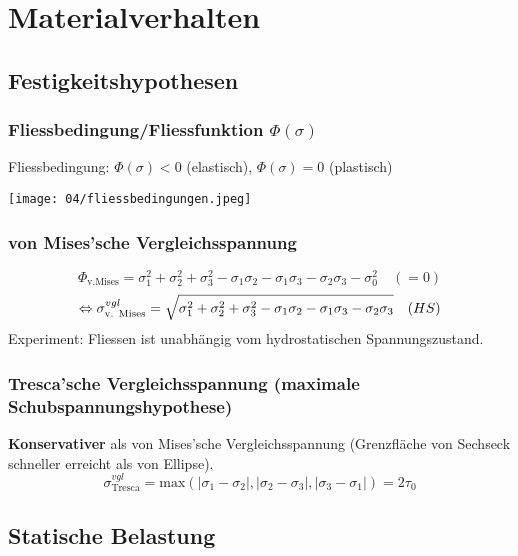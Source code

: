 \vspace{-3mm}
\section{Materialverhalten}{}
    \subsection{Festigkeitshypothesen}
        \subsubsection{Fliessbedingung/Fliessfunktion $\Phi(\sigma)$}
            Fliessbedingung: $\Phi(\sigma)<0$ (elastisch), $\Phi(\sigma)=0$ (plastisch)
            \begin{center}
                \texttt{[image: 04/fliessbedingungen.jpeg]}
            \end{center}
            
        \subsubsection{von Mises'sche Vergleichsspannung}
            \[\Phi_{\textrm{v.Mises}}= \sigma_1^2+\sigma_2^2+\sigma_3^2-\sigma_1\sigma_2-\sigma_1\sigma_3-\sigma_2\sigma_3 -\sigma_0^2\quad(=0)\]
            \[\Leftrightarrow \sigma_{\textrm{v. Mises}}^{vgl}= \sqrt{\sigma_1^2+\sigma_2^2+\sigma_3^2-\sigma_1\sigma_2-\sigma_1\sigma_3-\sigma_2\sigma_3} \quad\textrm(HS)\]
            Experiment: Fliessen ist unabhängig vom hydrostatischen Spannungszustand.
        \subsubsection{Tresca'sche Vergleichsspannung (maximale Schubspannungshypothese)}
            \textbf{Konservativer} als von Mises'sche Vergleichsspannung (Grenzfläche von Sechseck schneller erreicht als von Ellipse).
            \vspace{-2mm}\[\sigma_{\textrm{Tresca}}^{vgl}=\textrm{max} \left(|\sigma_1-\sigma_2|,|\sigma_2-\sigma_3|,|\sigma_3-\sigma_1| \right) =2\tau_0\]
    \subsection{Statische Belastung}
        
